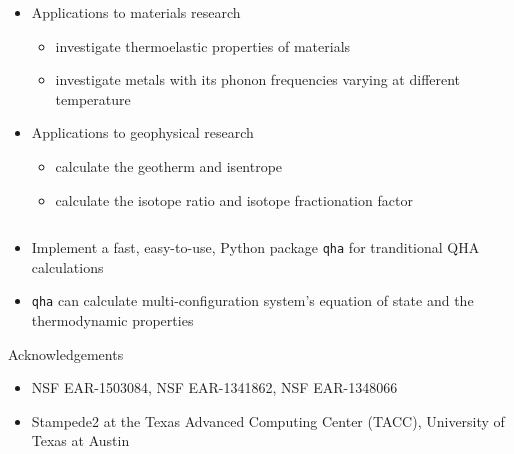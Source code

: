 \documentclass[13pt,aspectratio=169]{beamer}
\begin{document}
\begin{frame}{\subsecname}
\begin{columns}
		\begin{column}{0.45\textwidth}
			\begin{itemize}[<+(1)->]
				\item Applications to materials research
				      \begin{itemize}
					      \item investigate thermoelastic properties of materials \cite{Wu:2011ea}
					      \item investigate metals with its phonon frequencies varying at different temperature
				      \end{itemize}
				\item Applications to geophysical research
				      \begin{itemize}
					      \item calculate the geotherm and isentrope \cite{Cardona:2017dd}
					      \item calculate the isotope ratio and isotope fractionation factor
				      \end{itemize}
			\end{itemize}
		\end{column}
	\end{columns}
\end{frame}

\begin{frame}{\secname}
	\begin{itemize}[<+(1)->]
		\setlength\itemsep{1em}
		\item Implement a fast, easy-to-use, Python package \texttt{qha} for tranditional QHA calculations
		\item \texttt{qha} can calculate multi-configuration system's equation of state and the thermodynamic properties
	\end{itemize}
\end{frame}



\begin{frame}{Acknowledgements}
	\begin{itemize}
		\item NSF EAR-1503084, NSF EAR-1341862, NSF EAR-1348066
		\item Stampede2 at the Texas Advanced Computing Center (TACC), University of Texas at Austin
	\end{itemize}
\end{frame}
\end{document}
